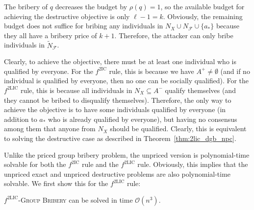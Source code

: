 \documentclass[
    12pt,               %
    a4paper,            %
    bibtotoc,           %
    pointlessnumbers,   %
    ngerman,            %
    titlepage,          %
    leqno,              %
    ]{scrarticle}       %
\newcommand\thmref{Theorem~\ref}
\begin{document}
\begin{Proof}
The bribery of $q$ decreases the budget by $\rho(q) = 1$, so the available budget for achieving the destructive objective is only $\ell - 1 = k$. Obviously, the remaining budget does not suffice for bribing any individuals in $N_X \cup N_\mathcal{F} \cup \{a_\ast\}$ because they all have a bribery price of $k+1$. Therefore, the attacker can only bribe individuals in $\tilde{N}_\mathcal{F}$.

Clearly, to achieve the objective, there must be at least one individual who is qualified by everyone. For the $f^{\text{2IC}}$ rule, this is because we have $A^+ \neq \emptyset$ (and if no individual is qualified by everyone, then no one can be socially qualified). For the $f^{\text{2LIC}}$ rule, this is because all individuals in $N_X \subseteq A^-$ qualify themselves (and they cannot be bribed to disqualify themselves). Therefore, the only way to achieve the objective is to have some individuals qualified by everyone (in addition to $a_\ast$ who is already qualified by everyone), but having no consensus among them that anyone from $N_X$ should be qualified. Clearly, this is equivalent to solving the destructive case as described in \thmref{thm:2lic_dgb_npc}.
\end{Proof}



Unlike the priced group bribery problem, the unpriced version is polynomial-time solvable for both the $f^{\text{2IC}}$ rule and the $f^{\text{2LIC}}$ rule. Obviously, this implies that the unpriced exact and unpriced destructive problems are also polynomial-time solvable. We first show this for the $f^{\text{2LIC}}$ rule:

\begin{Theorem} \label{thm:2lic_gb_p}
$f^{\text{2LIC}}$-\textsc{Group Bribery} can be solved in time $\mathcal{O}(n^3)$.
\end{Theorem}
\end{document}
